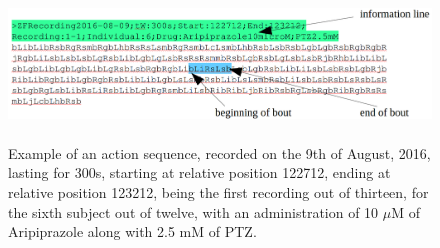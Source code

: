 \documentclass[a4paper,12pt]{article}
\begin{document}
\begin{figure}[h!]
\begin{center}
\includegraphics[width=16cm,height=4cm]{action_seq_ex.png}
\caption{Example of an action sequence, recorded on the 9th of August, 2016, lasting for 300s, starting at relative position 122712, ending at relative position 123212, being the first recording out of thirteen, for the sixth subject out of twelve, with an administration of 10 $\mu$M of Aripiprazole along with 2.5 mM of PTZ.}
\end{center}
\end{figure}
\newpage
\end{document}
